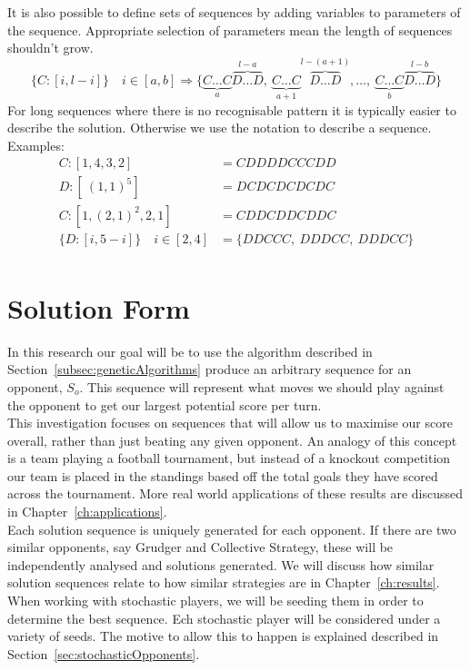 It is also possible to define sets of sequences by adding variables to parameters of the sequence.
Appropriate selection of parameters mean the length of sequences shouldn't grow.
\[ \{C:[i,l-i]\} \quad i\in [a,b] \Rightarrow \{\underbrace{C\ldots C}_{a}\overbrace{D\ldots D}^{l-a},\ \underbrace{C\ldots C}_{a+1}\overbrace{D\ldots D}^{l-(a+1)},\ldots ,\ \underbrace{C\ldots C}_{b}\overbrace{D\ldots D}^{l-b}\} \]
For long sequences where there is no recognisable pattern it is typically easier to describe the solution.
Otherwise we use the notation to describe a sequence.\\
Examples:
\begin{align}
    C:[1,4,3,2] &= CDDDDCCCDD\\
    D:[\ (1,1)^{5}] &= DCDCDCDCDC\\
    C:[1,(2,1)^{2},2,1] &= CDDCDDCDDC\\
    \{D:[i,5-i]\} \quad i\in [2,4] &= \{DDCCC,\ DDDCC,\ DDDCC\}\\
\end{align}

\section{Solution Form}\label{sec:solutionForm}
In this research our goal will be to use the algorithm described in Section~\ref{subsec:geneticAlgorithms} produce an arbitrary sequence for an opponent, \(S_o\).
This sequence will represent what moves we should play against the opponent to get our largest potential score per turn.\\

This investigation focuses on sequences that will allow us to maximise our score overall, rather than just beating any given opponent.
An analogy of this concept is a team playing a football tournament, but instead of a knockout competition our team is placed in the standings based off the total goals they have scored across the tournament.
More real world applications of these results are discussed in Chapter~\ref{ch:applications}.\\

Each solution sequence is uniquely generated for each opponent.
If there are two similar opponents, say Grudger and Collective Strategy, these will be independently analysed and solutions generated. %
We will discuss how similar solution sequences relate to how similar strategies are in Chapter~\ref{ch:results}.
When working with stochastic players, we will be seeding them in order to determine the best sequence.
Ech stochastic player will be considered under a variety of seeds.
The motive to allow this to happen is explained described in Section~\ref{sec:stochasticOpponents}.

